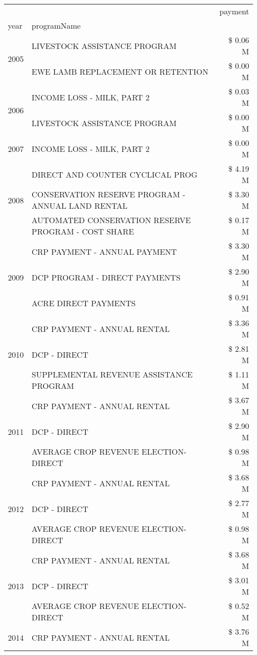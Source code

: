 \begin{tabular}{llr}
\toprule
 &  & payment \\
year & programName &  \\
\midrule
\multirow[t]{2}{*}{2005} & LIVESTOCK ASSISTANCE PROGRAM & \$ 0.06 M \\
 & EWE LAMB REPLACEMENT OR RETENTION & \$ 0.00 M \\
\cline{1-3}
\multirow[t]{2}{*}{2006} & INCOME LOSS - MILK, PART 2 & \$ 0.03 M \\
 & LIVESTOCK ASSISTANCE PROGRAM & \$ 0.00 M \\
\cline{1-3}
2007 & INCOME LOSS - MILK, PART 2 & \$ 0.00 M \\
\cline{1-3}
\multirow[t]{3}{*}{2008} & DIRECT AND COUNTER CYCLICAL PROG & \$ 4.19 M \\
 & CONSERVATION RESERVE PROGRAM - ANNUAL LAND RENTAL & \$ 3.30 M \\
 & AUTOMATED CONSERVATION RESERVE PROGRAM - COST SHARE & \$ 0.17 M \\
\cline{1-3}
\multirow[t]{3}{*}{2009} & CRP PAYMENT - ANNUAL PAYMENT & \$ 3.30 M \\
 & DCP PROGRAM - DIRECT PAYMENTS & \$ 2.90 M \\
 & ACRE DIRECT PAYMENTS & \$ 0.91 M \\
\cline{1-3}
\multirow[t]{3}{*}{2010} & CRP PAYMENT - ANNUAL RENTAL & \$ 3.36 M \\
 & DCP - DIRECT & \$ 2.81 M \\
 & SUPPLEMENTAL REVENUE ASSISTANCE PROGRAM & \$ 1.11 M \\
\cline{1-3}
\multirow[t]{3}{*}{2011} & CRP PAYMENT - ANNUAL RENTAL & \$ 3.67 M \\
 & DCP - DIRECT & \$ 2.90 M \\
 & AVERAGE CROP REVENUE ELECTION-DIRECT & \$ 0.98 M \\
\cline{1-3}
\multirow[t]{3}{*}{2012} & CRP PAYMENT - ANNUAL RENTAL & \$ 3.68 M \\
 & DCP - DIRECT & \$ 2.77 M \\
 & AVERAGE CROP REVENUE ELECTION-DIRECT & \$ 0.98 M \\
\cline{1-3}
\multirow[t]{3}{*}{2013} & CRP PAYMENT - ANNUAL RENTAL & \$ 3.68 M \\
 & DCP - DIRECT & \$ 3.01 M \\
 & AVERAGE CROP REVENUE ELECTION-DIRECT & \$ 0.52 M \\
\cline{1-3}
\multirow[t]{3}{*}{2014} & CRP PAYMENT - ANNUAL RENTAL & \$ 3.76 M \\

\end{tabular}
